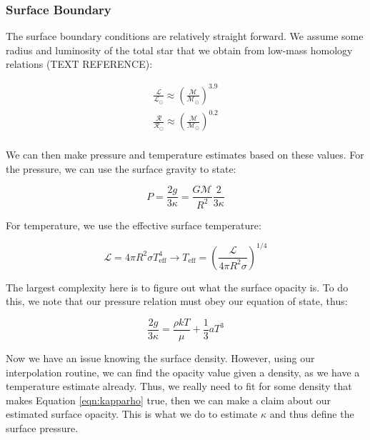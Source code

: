 \documentclass[twocolumn]{aastex631}
\begin{document}
\subsubsection{Surface Boundary}

The surface boundary conditions are relatively straight forward. We assume some radius and luminosity of the total star that we obtain from low-mass homology relations (TEXT REFERENCE):

\begin{equation}
\boxed{
\begin{array}{lcl}
\frac{\mathcal{L}}{\mathcal{L}_\odot} \approx \left(\frac{\mathcal{M}}{\mathcal{M}_\odot}\right)^{3.9} \\
\frac{\mathcal{R}}{\mathcal{R}_\odot} \approx \left(\frac{\mathcal{M}}{\mathcal{M}_\odot}\right)^{0.2} \\
\end{array}
}
\end{equation}

We can then make pressure and temperature estimates based on these values. For the pressure, we can use the surface gravity to state:

\begin{equation}
	P = \frac{2g}{3\kappa} = \frac{G\mathcal{M}}{R^2} \frac{2}{3\kappa}
\end{equation}

For temperature, we use the effective surface temperature:

\begin{equation}
	\mathcal{L} = 4\pi R^2 \sigma T_{\text{eff}}^4 \rightarrow T_\text{eff} = \left(\frac{\mathcal{L}}{4\pi R^2 \sigma}\right)^{1/4}
\end{equation}

The largest complexity here is to figure out what the surface opacity is. To do this, we note that our pressure relation must obey our equation of state, thus:

\begin{equation}
	\label{eqn:kapparho}
	\frac{2g}{3\kappa} = \frac{\rho k T}{\mu} + \frac{1}{3}aT^3
\end{equation}

Now we have an issue knowing the surface density. However, using our interpolation routine, we can find the opacity value given a density, as we have a temperature estimate already. Thus, we really need to fit for some density that makes Equation \ref{eqn:kapparho} true, then we can make a claim about our estimated surface opacity. This is what we do to estimate $\kappa$ and thus define the surface pressure.
\end{document}
